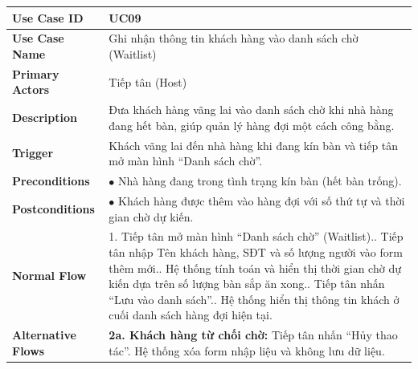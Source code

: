 \begin{longtable}{|p{3.5cm}|p{12.5cm}|}
\hline
\textbf{Use Case ID} & UC09 \\ \hline
\textbf{Use Case Name} & Ghi nhận thông tin khách hàng vào danh sách chờ (Waitlist) \\ \hline
\textbf{Primary Actors} & Tiếp tân (Host) \\ \hline
\textbf{Description} & Đưa khách hàng vãng lai vào danh sách chờ khi nhà hàng đang hết bàn, giúp quản lý hàng đợi một cách công bằng. \\ \hline
\textbf{Trigger} & Khách vãng lai đến nhà hàng khi đang kín bàn và tiếp tân mở màn hình ``Danh sách chờ''. \\ \hline
\textbf{Preconditions} & $\bullet$ Nhà hàng đang trong tình trạng kín bàn (hết bàn trống). \\ \hline
\textbf{Postconditions} &
$\bullet$ Khách hàng được thêm vào hàng đợi với số thứ tự và thời gian chờ dự kiến. \\ \hline
\textbf{Normal Flow} &
1. Tiếp tân mở màn hình ``Danh sách chờ'' (Waitlist).\newline
2. Tiếp tân nhập Tên khách hàng, SĐT và số lượng người vào form thêm mới.\newline
3. Hệ thống tính toán và hiển thị thời gian chờ dự kiến dựa trên số lượng bàn sắp ăn xong.\newline
4. Tiếp tân nhấn ``Lưu vào danh sách''.\newline
5. Hệ thống hiển thị thông tin khách ở cuối danh sách hàng đợi hiện tại. \\ \hline
\textbf{Alternative Flows} &
\textbf{2a. Khách hàng từ chối chờ:} Tiếp tân nhấn ``Hủy thao tác''. Hệ thống xóa form nhập liệu và không lưu dữ liệu. \\ \hline
\end{longtable}

